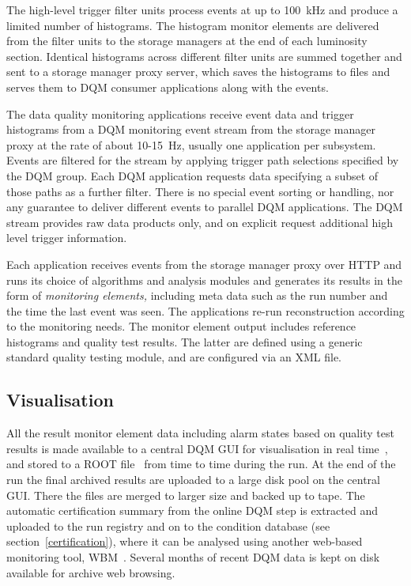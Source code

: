 \documentclass[a4paper]{jpconf}
\begin{document}
The high-level trigger filter units process events at up to 100~kHz and
produce a limited number of histograms.  The histogram monitor elements are
delivered from the filter units to the storage managers at the end of each
luminosity section.  Identical histograms across different filter units are
summed together and sent to a storage manager proxy server, which saves the
histograms to files and serves them to DQM consumer applications along with
the events.

The data quality monitoring applications receive event data and trigger
histograms from a DQM monitoring event stream from the storage manager proxy
at the rate of about 10-15~Hz, usually one application per subsystem.  Events
are filtered for the stream by applying trigger path selections specified by
the DQM group.  Each DQM application requests data specifying a subset of
those paths as a further filter.  There is no special event sorting or
handling, nor any guarantee to deliver different events to parallel DQM
applications.  The DQM stream provides raw data products only, and on explicit
request additional high level trigger information.

Each application receives events from the storage manager proxy over HTTP and
runs its choice of algorithms and analysis modules and generates its results
in the form of {\em monitoring elements,} including meta data such as the run
number and the time the last event was seen.  The applications re-run
reconstruction according to the monitoring needs.  The monitor element output
includes reference histograms and quality test results.  The latter are defined
using a generic standard quality testing module, and are configured via an XML
file.

\subsection{Visualisation}

All the result monitor element data including alarm states based on quality
test results is made available to a central DQM GUI for visualisation in real
time~\cite{dqm_gui_09}, and stored to a ROOT file~\cite{root} from time to
time during the run.  At the end of the run the final archived results are
uploaded to a large disk pool on the central GUI.  There the files are merged
to larger size and backed up to tape.  The automatic certification summary
from the online DQM step is extracted and uploaded to the run registry and on
to the condition database (see section~\ref{certification}), where it can be
analysed using another web-based monitoring tool, WBM~\cite{wbm}.  Several
months of recent DQM data is kept on disk available for archive web browsing.
\end{document}

